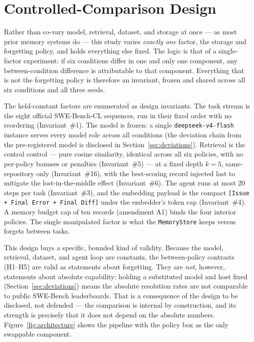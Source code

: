 

\section{Controlled-Comparison Design}

Rather than co-vary model, retrieval, dataset, and storage at once --- as most prior memory
systems do --- this study varies \emph{exactly one} factor, the storage and forgetting
policy, and holds everything else fixed. The logic is that of a single-factor experiment:
if six conditions differ in one and only one component, any between-condition difference is
attributable to that component. Everything that is not the forgetting policy is therefore an
invariant, frozen and shared across all six conditions and all three seeds.

The held-constant factors are enumerated as design invariants. The task stream is the eight
official SWE-Bench-CL sequences, run in their fixed order with no reordering (Invariant~\#1).
The model is frozen: a single \texttt{deepseek-v4-flash} instance serves every model role
across all conditions (the deviation chain from the pre-registered model is disclosed in
Section~\ref{sec:deviations}). Retrieval is the central control --- pure cosine similarity,
identical across all six policies, with no per-policy bonuses or penalties (Invariant~\#5)
--- at a fixed depth $k=5$, same-repository only (Invariant~\#16), with the best-scoring
record injected last to mitigate the lost-in-the-middle effect (Invariant~\#6). The agent
runs at most 20 steps per task (Invariant~\#3), and the embedding payload is the compact
\texttt{[Issue + Final Error + Final Diff]} under the embedder's token cap (Invariant~\#4).
A memory budget cap of ten records (amendment A1) binds the four interior policies. The
single manipulated factor is what the \texttt{MemoryStore} keeps versus forgets between
tasks.

This design buys a specific, bounded kind of validity. Because the model, retrieval,
dataset, and agent loop are constants, the between-policy contrasts (H1--H5) are valid as
statements about forgetting. They are \emph{not}, however, statements about absolute
capability: holding a substituted model and host fixed (Section~\ref{sec:deviations}) means
the absolute resolution rates are not comparable to public SWE-Bench leaderboards. That is a
consequence of the design to be disclosed, not defended --- the comparison is internal by
construction, and its strength is precisely that it does not depend on the absolute numbers.
Figure~\ref{fig:architecture} shows the pipeline with the policy box as the only swappable
component.

